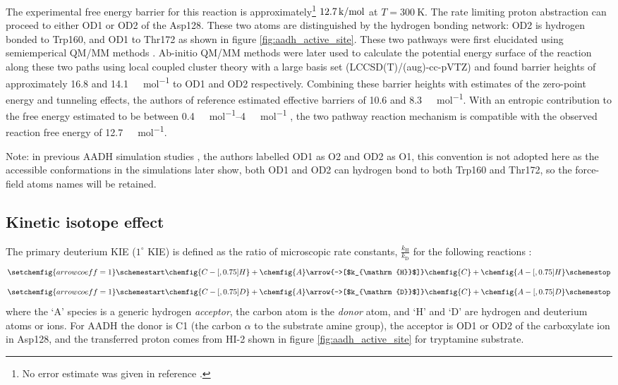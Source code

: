 The experimental free energy barrier for this reaction is approximately\footnote{No error estimate was given in reference \cite{masgrauAtomicDescriptionEnzyme2006}.} $ \SI{12.7}{\kilo\cal\per\mol}$ at $T=\SI{300}{\kelvin}$. The rate limiting proton abstraction can proceed to either OD1 or OD2 of the Asp128. These two atoms are distinguished by the hydrogen bonding network: OD2 is hydrogen bonded to Trp160, and OD1 to Thr172 as shown in figure \ref{fig:aadh_active_site}. These two pathways were first elucidated using semiemperical QM/MM methods \cite{masgrauAtomicDescriptionEnzyme2006}. Ab-initio QM/MM methods were later used to calculate the potential energy surface of the reaction along these two paths using local coupled cluster theory with a large basis set (LCCSD(T)/(aug)-cc-pVTZ) \cite{ranaghanInitioQMMM2017} and found barrier heights of approximately \num{16.8} and \SI{14.1}{\kilo\cal\per\mol} to OD1 and OD2 respectively.  Combining these barrier heights with estimates of the zero-point energy and tunneling effects, the authors of reference \cite{ranaghanInitioQMMM2017} estimated effective barriers of \num{10.6} and \SI{8.3}{\kilo\cal\per\mol}. With an entropic contribution to the free energy estimated to be between \SIrange[range-phrase=\text{--}]{0.4}{4}{\kilo\cal\per\mol} \cite{claeyssensHighAccuracyComputationReaction2006, kazemiEnzymeCatalysisEntropy2016}, the two pathway reaction mechanism is compatible with the observed reaction free energy of \SI{12.7}{\kilo\cal\per\mol}. 

Note: in previous AADH simulation studies \cite{masgrauAtomicDescriptionEnzyme2006,masgrauTunnelingClassicalPaths2007,ranaghanInitioQMMM2017}, the authors labelled OD1 as O2 and OD2 as O1, this convention is not adopted here as the accessible conformations in the simulations later show, both OD1 and OD2 can hydrogen bond to both Trp160 and Thr172, so the force-field atoms names will be retained. 


\subsection{Kinetic isotope effect}
The primary deuterium KIE ($\mathrm{1}^{\circ}$ KIE) is defined as the ratio of microscopic rate constants, $\frac{k_{\mathrm{H}}}{k_{\mathrm{D}}}$ for the following reactions \cite{bisswanger2017enzyme}: 
\begin{equation}
\setchemfig{arrow coeff=1}
\schemestart
    \chemfig{C-[,0.75]H} + \chemfig{A}
    \arrow{->[$k_{\mathrm{H}}$]}
    \chemfig{C} + \chemfig{A-[,0.75]H}
\schemestop
\end{equation}
\begin{equation}
\setchemfig{arrow coeff=1}
\schemestart
    \chemfig{C-[,0.75]D} + \chemfig{A}
    \arrow{->[$k_{\mathrm{D}}$]}
    \chemfig{C} + \chemfig{A-[,0.75]D}
\schemestop
\end{equation}
where the `A' species is a generic hydrogen \emph{acceptor}, the carbon atom is the \emph{donor} atom, and `H' and `D' are hydrogen and deuterium atoms or ions. For AADH the donor is C1 (the carbon $\alpha$ to the substrate amine group), the acceptor is OD1 or OD2 of the carboxylate ion in Asp128, and the transferred proton comes from HI-2 shown in figure \ref{fig:aadh_active_site} for tryptamine substrate. 

